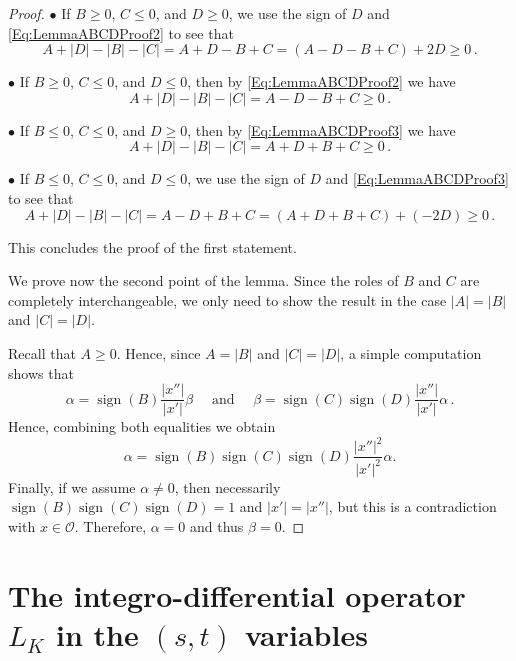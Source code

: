 \documentclass[12pt,reqno]{amsart}
\theoremstyle{definition}
\theoremstyle{remark}
\newcommand{\ocal}{\mathcal{O}}
\DeclareMathOperator{\sign}{sign}
\numberwithin{equation}{section}
\begin{document}
\begin{proof}
		$\bullet$ If $B \geq 0$, $C \leq 0$, and $D \geq 0$, we use the sign of $D$ and \eqref{Eq:LemmaABCDProof2} to see that
		$$
		A + |D| - |B| - |C| = A + D - B + C =  (A - D - B + C) + 2D \geq 0\,.
		$$
		
		$\bullet$ If $B \geq 0$, $C \leq 0$, and $D \leq 0$, then by \eqref{Eq:LemmaABCDProof2} we have
		$$
		A + |D| - |B| - |C| = A - D - B + C \geq 0\,.
		$$
		
		$\bullet$ If $B \leq 0$, $C \leq 0$, and $D \geq 0$, then by \eqref{Eq:LemmaABCDProof3} we have
		$$
		A + |D| - |B| - |C| = A + D + B + C \geq 0\,.
		$$
		
		$\bullet$ If $B \leq 0$, $C \leq 0$, and $D \leq 0$, we use the sign of $D$ and \eqref{Eq:LemmaABCDProof3} to see that
		$$
		A + |D| - |B| - |C| = A - D + B + C =  (A + D + B + C) + (-2D) \geq 0\,.
		$$
		
		This concludes the proof of the first statement.
		
		We prove now the second point of the lemma. Since the roles of $B$ and $C$ are completely interchangeable, we only need to show the result in the case $|A| = |B|$ and $|C| = |D|$.
		
		Recall that $A \geq 0$. Hence, since $A = |B|$ and $|C| = |D|$, a simple computation shows that
		$$
		\alpha = \sign (B) \dfrac{|x''|}{|x'|}\beta \quad \textrm{ and } \quad
		\beta = \sign (C) \sign(D) \dfrac{|x''|}{|x'|} \alpha \,.
		$$
		Hence, combining both equalities we obtain
		$$
		\alpha = \sign (B) \sign (C) \sign(D) \dfrac{|x''|^2}{|x'|^2} \alpha.
		$$
		Finally, if we assume $\alpha \neq 0$, then necessarily $\sign (B) \sign (C) \sign(D)=1$ and $|x'|= |x''|$, but this is a contradiction with $x\in \ocal$. Therefore, $\alpha = 0$ and thus $\beta =0$.
	\end{proof}
	
	
	
	
	
	
	
	
	\section{The integro-differential operator $L_K$ in the $(s,t)$ variables}
	\label{Sec:stcomputations}
	
\end{document}
